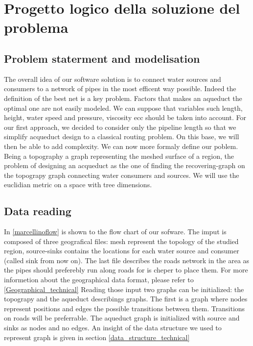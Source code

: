 \chapter{Progetto logico della soluzione del problema}
\label{capitolo4}
\thispagestyle{empty}

\section{Problem staterment and modelisation}
The overall idea of our software solution is to connect water sources and consumers to a network of 
pipes in the most efficent way possible. Indeed the definition of the best net is a key problem. 
Factors that makes an aqueduct the optimal one are not easily modeled. We can suppose that variables 
such length, height, water speed and pressure, viscosity ecc should be taken into account.
\hfill For our first approach, we decided to consider only the pipeline length so that we simplify 
acqueduct design to a classical routing problem. On this base, we will then be able to add complexity.
\hfill We can now more formaly define our poblem. Being a topography a graph representing the meshed 
surface of a region, the problem of designing an acqueduct as the one of finding the recovering-graph 
on the topograpy graph connecting water consumers and sources. We will use the euclidian metric on a 
space with tree dimensions.



\section{Data reading}
In \ref{marcellinoflow} is shown to the flow chart of our sofware. 
The imput is composed of three geografical files: mesh represent the topology of the studied region, 
source-sinks contains the locations for each water source and consumer (called sink from now on). 
The last file describes the roads network in the area as the pipes should preferebly run along roads 
for is cheper to place them. For more informetion about the geographical data format, please refer to
 \ref{Geographical_technical} Reading those input two graphs can be initialized: the topograpy and the 
 aqueduct describings graphs. The first is a graph where nodes represent positions and edges the 
 possible transitions between them. Transitions on roads will be preferrable. The aqueduct graph is 
 initialized with source and sinks as nodes and no edges. An insight of the data structure we used to 
 represent graph is given in section \ref{data_structure_technical}

